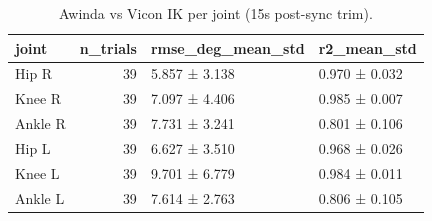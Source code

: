 \begin{table}
\caption{Awinda vs Vicon IK per joint (15s post-sync trim).}
\label{tab:table2_ik_per_joint}
\begin{tabular}{lrll}
\toprule
joint & n\_trials & rmse\_deg\_mean\_std & r2\_mean\_std \\
\midrule
Hip R & 39 & 5.857 ± 3.138 & 0.970 ± 0.032 \\
Knee R & 39 & 7.097 ± 4.406 & 0.985 ± 0.007 \\
Ankle R & 39 & 7.731 ± 3.241 & 0.801 ± 0.106 \\
Hip L & 39 & 6.627 ± 3.510 & 0.968 ± 0.026 \\
Knee L & 39 & 9.701 ± 6.779 & 0.984 ± 0.011 \\
Ankle L & 39 & 7.614 ± 2.763 & 0.806 ± 0.105 \\
\bottomrule
\end{tabular}
\end{table}
